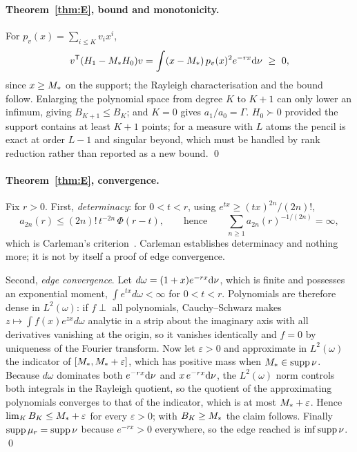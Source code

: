\paragraph{Theorem~\ref{thm:E}, bound and monotonicity.}
For $p_{v}(x)=\sum_{i\le K}v_{i}x^{i}$,
\begin{equation}
v^{\mathsf{T}}(H_{1}-M_{*} H_{0})v
=\int(x-M_{*})\,p_{v}(x)^{2}e^{-rx}\mathrm{d}\nu\ \ge\ 0,
\end{equation}
since $x\ge M_{*}$ on the support; the Rayleigh characterisation and the bound
follow. Enlarging the polynomial space from degree $K$ to $K+1$ can only lower
an infimum, giving $B_{K+1}\le B_{K}$; and $K=0$ gives $a_{1}/a_{0}=\Gamma$.
$H_{0}\succ0$ provided the support contains at least $K+1$ points; for a
measure with $L$ atoms the pencil is exact at order $L-1$ and singular
beyond, which must be handled by rank reduction rather than reported as a new
bound. \qed

\paragraph{Theorem~\ref{thm:E}, convergence.}
Fix $r>0$. First, \emph{determinacy}: for $0<t<r$, using
$e^{tx}\ge(tx)^{2n}/(2n)!$,
\begin{equation}
a_{2n}(r)\le(2n)!\,t^{-2n}\,\Phi(r-t),
\qquad\text{hence}\qquad
\sum_{n\ge1}a_{2n}(r)^{-1/(2n)}=\infty,
\end{equation}
which is Carleman's criterion~\cite{akhiezer1965moment}. Carleman establishes
determinacy and nothing more; it is not by itself a proof of edge convergence.

Second, \emph{edge convergence}. Let $d\omega=(1+x)e^{-rx}\mathrm{d}\nu$, which is
finite and possesses an exponential moment, $\int e^{tx}d\omega<\infty$ for
$0<t<r$. Polynomials are therefore dense in $L^{2}(\omega)$: if $f\perp$ all
polynomials, Cauchy--Schwarz makes $z\mapsto\int f(x)e^{zx}d\omega$ analytic in
a strip about the imaginary axis with all derivatives vanishing at the origin,
so it vanishes identically and $f=0$ by uniqueness of the Fourier transform.
Now let $\varepsilon>0$ and approximate in $L^{2}(\omega)$ the indicator of
$[M_{*},M_{*}+\varepsilon]$, which has positive mass when
$M_{*}\in\operatorname{supp}\nu$. Because $d\omega$ dominates both $e^{-rx}\mathrm{d}\nu$ and
$x\,e^{-rx}\mathrm{d}\nu$, the $L^{2}(\omega)$ norm controls both integrals in the
Rayleigh quotient, so the quotient of the approximating polynomials converges
to that of the indicator, which is at most $M_{*}+\varepsilon$. Hence
$\lim_{K}B_{K}\le M_{*}+\varepsilon$ for every $\varepsilon>0$; with
$B_{K}\ge M_{*}$ the claim follows. Finally $\operatorname{supp}\mu_{r}=\operatorname{supp}\nu$ because
$e^{-rx}>0$ everywhere, so the edge reached is $\inf\operatorname{supp}\nu$. \qed

